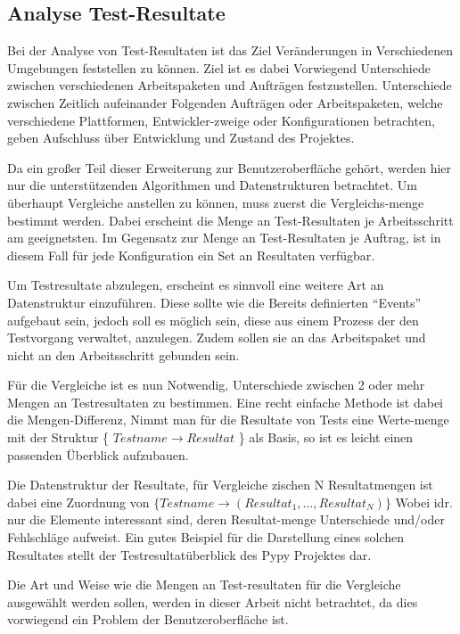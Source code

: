\subsection{Analyse Test-Resultate}

Bei der Analyse von Test-Resultaten ist das Ziel Veränderungen in Verschiedenen Umgebungen feststellen zu können.
Ziel ist es dabei Vorwiegend Unterschiede zwischen verschiedenen Arbeitspaketen und Aufträgen festzustellen. Unterschiede zwischen Zeitlich aufeinander Folgenden Aufträgen oder Arbeitspaketen, welche verschiedene Plattformen, Entwickler-zweige oder Konfigurationen betrachten, geben Aufschluss über Entwicklung und Zustand des Projektes.

Da ein großer Teil dieser Erweiterung zur Benutzeroberfläche gehört,
werden hier nur die unterstützenden Algorithmen und Datenstrukturen betrachtet.
Um überhaupt Vergleiche anstellen zu können, muss zuerst die Vergleichs-menge bestimmt werden. Dabei erscheint die Menge an Test-Resultaten je Arbeitsschritt am geeignetsten. Im Gegensatz zur Menge an Test-Resultaten je Auftrag,
ist in diesem Fall für jede Konfiguration ein Set an Resultaten verfügbar.

Um Testresultate abzulegen, erscheint es sinnvoll eine weitere Art an Datenstruktur einzuführen.
Diese sollte wie die Bereits definierten ``Events'' aufgebaut sein,
jedoch soll es möglich sein, diese aus einem Prozess der den Testvorgang verwaltet,
anzulegen. Zudem sollen sie an das Arbeitspaket und nicht an den Arbeitsschritt gebunden sein.

Für die Vergleiche ist es nun Notwendig,
Unterschiede zwischen 2 oder mehr Mengen an Testresultaten zu bestimmen.
Eine recht einfache Methode ist dabei die Mengen-Differenz,
Nimmt man für die Resultate von Tests eine Werte-menge mit der Struktur \{ $Testname \rightarrow Resultat$ \} als Basis,
so ist es leicht einen passenden Überblick aufzubauen.

Die Datenstruktur der Resultate, für Vergleiche zischen N Resultatmengen
ist dabei eine Zuordnung von
$\{ Testname \rightarrow ( Resultat_{1},\ldots,Resultat_{N})\}$
Wobei idr. nur die Elemente interessant sind,
deren Resultat-menge Unterschiede und/oder Fehlschläge aufweist.
Ein gutes Beispiel für die Darstellung eines solchen Resultates
stellt der Testresultatüberblick des Pypy Projektes \cite{pypy:overview} dar.

Die Art und Weise wie die Mengen an Test-resultaten für die Vergleiche ausgewählt werden sollen, werden in dieser Arbeit nicht betrachtet,
da dies vorwiegend ein Problem der Benutzeroberfläche ist.

